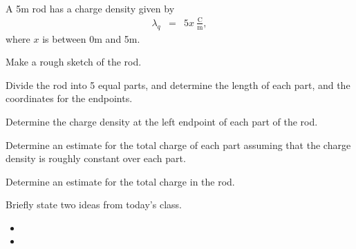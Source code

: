 
\begin{problem}
  \item ~
\end{problem}



\begin{problem}
\item A 5m rod has a charge density given by 
  \begin{eqnarray*}
    \lambda_q & = & 5x~\frac{\mathrm{C}}{\mathrm{m}},
  \end{eqnarray*}
  where $x$ is between 0m and 5m. 
  \begin{subproblem}
  \item Make a rough sketch of the rod.
    \vspace{4em}
  \item Divide the rod into 5 equal parts, and determine the length of
    each part, and the coordinates for the endpoints.
    \vfill
  \item Determine the charge density at the left endpoint of each part
    of the rod.  
    \vfill
    \clearpage
  \item Determine an estimate for the total charge of each part
    assuming that the charge density is roughly constant over each
    part.
    \vfill
  \item Determine an estimate for the total charge in the rod.
    \vfill
  \end{subproblem}
\end{problem}

\postClass

\begin{problem}
\item Briefly state two ideas from today's class.
  \begin{itemize}
  \item 
  \item 
  \end{itemize}
\item 
  \begin{subproblem}
    \item
  \end{subproblem}
\end{problem}



